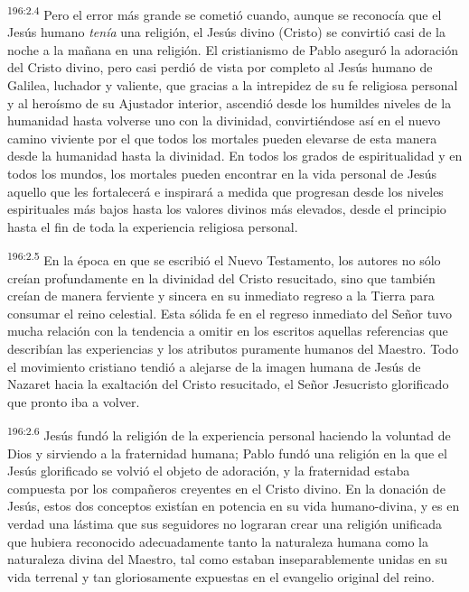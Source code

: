 \par 
\textsuperscript{196:2.4} Pero el error más grande se cometió cuando, aunque se reconocía que el Jesús humano \textit{tenía} una religión, el Jesús divino (Cristo) se convirtió casi de la noche a la mañana en una religión. El cristianismo de Pablo aseguró la adoración del Cristo divino, pero casi perdió de vista por completo al Jesús humano de Galilea, luchador y valiente, que gracias a la intrepidez de su fe religiosa personal y al heroísmo de su Ajustador interior, ascendió desde los humildes niveles de la humanidad hasta volverse uno con la divinidad, convirtiéndose así en el nuevo camino viviente por el que todos los mortales pueden elevarse de esta manera desde la humanidad hasta la divinidad. En todos los grados de espiritualidad y en todos los mundos, los mortales pueden encontrar en la vida personal de Jesús aquello que les fortalecerá e inspirará a medida que progresan desde los niveles espirituales más bajos hasta los valores divinos más elevados, desde el principio hasta el fin de toda la experiencia religiosa personal.

\par 
\textsuperscript{196:2.5} En la época en que se escribió el Nuevo Testamento, los autores no sólo creían profundamente en la divinidad del Cristo resucitado, sino que también creían de manera ferviente y sincera en su inmediato regreso a la Tierra para consumar el reino celestial. Esta sólida fe en el regreso inmediato del Señor tuvo mucha relación con la tendencia a omitir en los escritos aquellas referencias que describían las experiencias y los atributos puramente humanos del Maestro. Todo el movimiento cristiano tendió a alejarse de la imagen humana de Jesús de Nazaret hacia la exaltación del Cristo resucitado, el Señor Jesucristo glorificado que pronto iba a volver.

\par 
\textsuperscript{196:2.6} Jesús fundó la religión de la experiencia personal haciendo la voluntad de Dios y sirviendo a la fraternidad humana; Pablo fundó una religión en la que el Jesús glorificado se volvió el objeto de adoración, y la fraternidad estaba compuesta por los compañeros creyentes en el Cristo divino. En la donación de Jesús, estos dos conceptos existían en potencia en su vida humano-divina, y es en verdad una lástima que sus seguidores no lograran crear una religión unificada que hubiera reconocido adecuadamente tanto la naturaleza humana como la naturaleza divina del Maestro, tal como estaban inseparablemente unidas en su vida terrenal y tan gloriosamente expuestas en el evangelio original del reino.

